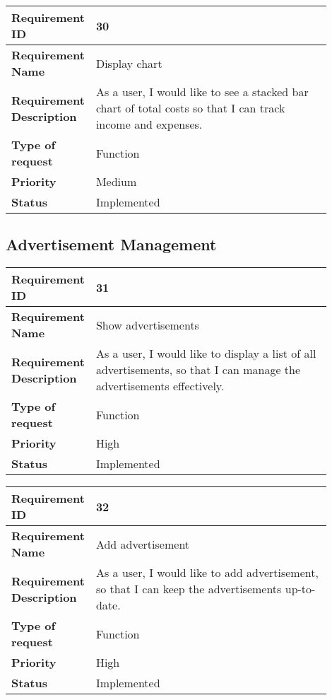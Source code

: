 \begin{table}[htbp]
\centering
\begin{tabular}{|m{0.15\linewidth}|m{0.75\linewidth}|}
\hline
\textbf{Requirement ID} & 30 \\
\hline
\textbf{Requirement Name} & Display chart \\
\hline
\textbf{Requirement Description} & As a user, I would like to see a stacked bar chart of total costs so that I can track income and expenses. \\
\hline
\textbf{Type of request} & Function \\
\hline
\textbf{Priority} & Medium \\
\hline
\textbf{Status} & Implemented \\
\hline
\end{tabular}
\end{table}

\newpage
\subsection{Advertisement Management}
\begin{table}[htbp]
\centering
\begin{tabular}{|m{0.15\linewidth}|m{0.75\linewidth}|}
\hline
\textbf{Requirement ID} & 31 \\
\hline
\textbf{Requirement Name} & Show advertisements  \\
\hline
\textbf{Requirement Description} & As a user, I would like to display a list of all advertisements, so that I can manage the advertisements effectively. \\
\hline
\textbf{Type of request} & Function \\
\hline
\textbf{Priority} & High \\
\hline
\textbf{Status} & Implemented \\
\hline
\end{tabular}
\end{table}


\begin{table}[htbp]
\centering
\begin{tabular}{|m{0.15\linewidth}|m{0.75\linewidth}|}
\hline
\textbf{Requirement ID} & 32 \\
\hline
\textbf{Requirement Name} & Add advertisement \\
\hline
\textbf{Requirement Description} & As a user, I would like to add advertisement, so that I can keep the advertisements up-to-date. \\
\hline
\textbf{Type of request} & Function \\
\hline
\textbf{Priority} & High \\
\hline
\textbf{Status} & Implemented \\
\hline
\end{tabular}
\end{table}


